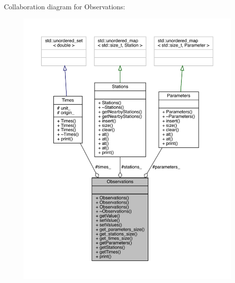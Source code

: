 Collaboration diagram for Observations\+:
\nopagebreak
\begin{figure}[H]
\begin{center}
\leavevmode
\includegraphics[width=350pt]{class_observations__coll__graph}
\end{center}
\end{figure}
